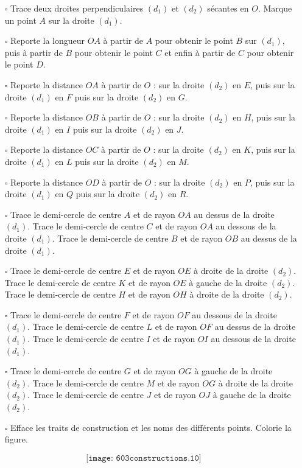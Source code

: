 \begin{itemize} 
\item[$\square$] Trace deux droites perpendiculaires $(d_1)$ et
$(d_2)$ sécantes en $O$. Marque un point $A$ sur la droite $(d_1)$.
\item[$\square$] Reporte la longueur $OA$ à partir de $A$ pour obtenir
le point $B$ sur $(d_1)$, puis à partir de $B$ pour obtenir le point
$C$ et enfin à partir de $C$ pour obtenir le point $D$.
\item[$\square$] Reporte la distance $OA$ à partir de $O$ : sur la
droite $(d_2)$ en $E$, puis sur la droite $(d_1)$ en $F$ puis sur la
droite $(d_2)$ en $G$.
\item[$\square$] Reporte la distance $OB$ à partir de $O$ : sur la
droite $(d_2)$ en $H$, puis sur la droite $(d_1)$ en $I$ puis sur la
droite $(d_2)$ en $J$.
\item[$\square$] Reporte la distance $OC$ à partir de $O$ : sur la
droite $(d_2)$ en $K$, puis sur la droite $(d_1)$ en $L$ puis sur la
droite $(d_2)$ en $M$.
\item[$\square$] Reporte la distance $OD$ à partir de $O$ : sur la
droite $(d_2)$ en $P$, puis sur la droite $(d_1)$ en $Q$ puis sur la
droite $(d_2)$ en $R$.
\item[$\square$] Trace le demi-cercle de centre $A$ et de rayon $OA$
au dessus de la droite $(d_1)$. Trace le demi-cercle de centre $C$ et
de rayon $OA$ au dessous de la droite $(d_1)$. Trace le demi-cercle de
centre $B$ et de rayon $OB$ au dessus de la droite $(d_1)$.
\item[$\square$] Trace le demi-cercle de centre $E$ et de rayon $OE$ à
droite de la droite $(d_2)$. Trace le demi-cercle de centre $K$ et de
rayon $OE$ à gauche de la droite $(d_2)$. Trace le demi-cercle de
centre $H$ et de rayon $OH$ à droite de la droite $(d_2)$.
\item[$\square$] Trace le demi-cercle de centre $F$ et de rayon $OF$
au dessous de la droite $(d_1)$. Trace le demi-cercle de centre $L$ et
de rayon $OF$ au dessus de la droite $(d_1)$. Trace le demi-cercle de
centre $I$ et de rayon $OI$ au dessous de la droite $(d_1)$.
\item[$\square$] Trace le demi-cercle de centre $G$ et de rayon $OG$ à
gauche de la droite $(d_2)$. Trace le demi-cercle de centre $M$ et de
rayon $OG$ à droite de la droite $(d_2)$. Trace le demi-cercle de
centre $J$ et de rayon $OJ$ à gauche de la droite $(d_2)$.
\item[$\square$] Efface les traits de construction et les noms des
différents points. Colorie la figure.
\end{itemize}
\[\texttt{[image: 603constructions.10]}\]
